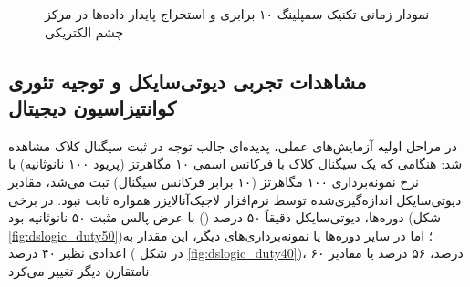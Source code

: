 \begin{figure}[ht]
\centering
\begin{latin}
\end{latin}
\caption{نمودار زمانی تکنیک سمپلینگ ۱۰ برابری و استخراج پایدار داده‌ها در مرکز چشم الکتریکی}
\label{fig:sampling_concept}
\end{figure}

\subsection[مشاهدات تجربی دیوتی‌سایکل و کوانتیزاسیون]{مشاهدات تجربی دیوتی‌سایکل و توجیه تئوری کوانتیزاسیون دیجیتال}
\label{sec:duty_cycle_quantization}
در مراحل اولیه آزمایش‌های عملی، پدیده‌ای جالب توجه در ثبت سیگنال کلاک  مشاهده شد: هنگامی که یک سیگنال کلاک با فرکانس اسمی ۱۰ مگاهرتز (پریود ۱۰۰ نانوثانیه) با نرخ نمونه‌برداری ۱۰۰ مگاهرتز (۱۰ برابر فرکانس سیگنال) ثبت می‌شد، مقادیر دیوتی‌سایکل اندازه‌گیری‌شده توسط نرم‌افزار لاجیک‌آنالایزر همواره ثابت نبود. در برخی دوره‌ها، دیوتی‌سایکل دقیقاً ۵۰ درصد () با عرض پالس مثبت ۵۰ نانوثانیه بود (شکل \ref{fig:dslogic_duty50})؛ اما در سایر دوره‌ها یا نمونه‌برداری‌های دیگر، این مقدار به اعدادی نظیر ۴۰ درصد ( در شکل \ref{fig:dslogic_duty40})، ۶۰ درصد، ۵۶ درصد یا مقادیر نامتقارن دیگر تغییر می‌کرد.

